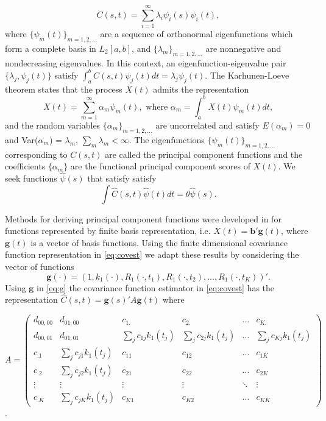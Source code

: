 \begin{equation*}
	C(s,t) = \sum_{i=1}^{\infty}\lambda_i\psi_i(s)\psi_i(t), 
\end{equation*}
where $\{\psi_m(t)\}_{m=1,2,\ldots}$ are a sequence of orthonormal eigenfunctions which form a complete basis in $L_2[a,b]$, and $\{\lambda_m \}_{m=1,2,\ldots}$ are nonnegative and nondecreasing eigenvalues. In this context, an eigenfunction-eigenvalue pair $\{\lambda_j, \psi_j(t)\}$ satisfy $\int_a^bC(s,t)\psi_j(t)dt = \lambda_j\psi_j(t)$. The Karhunen-Loeve theorem states that the process $X(t)$ admits the representation 
\begin{equation*}
	X(t) = \sum_{m=1}^{\infty}\alpha_m \psi_m(t), \mbox{ where } \alpha_m = \int_a^b X(t) \psi_m(t)dt, 
\end{equation*}
and the random variables $\{\alpha_m \}_{m=1,2,\ldots}$ are uncorrelated and satisfy $E(\alpha_m)=0$ and Var($\alpha_m$) = $\lambda_m$, $\sum_m \lambda_m < \infty$. The eigenfunctions $\{\psi_m(t)\}_{m=1,2,\ldots}$ corresponding to $C(s,t)$ are called the principal component functions and the coefficients $\{\alpha_m \}$ are the functional principal component scores of $X(t)$. We seek functions $\hat{\psi}(s)$ that satisfy satisfy 
\begin{equation}
	\label{eq:eigenfuns} \int \hat{C}(s,t)\hat{\psi}(t)dt=\theta\hat{\psi}(s). \nonumber
\end{equation}

Methods for deriving principal component functions were developed in \cite{FDA} for functions represented by finite basis representation, i.e. $X(t) = \mathbf{b}'\mathbf{g}(t)$, where $\mathbf{g}(t)$ is a vector of basis functions. Using the finite dimensional covariance function representation in \eqref{eq:covest} we adapt these results by considering the vector of functions 
\begin{equation}
	\mathbf{g(\cdot)}=(1, k_1(\cdot),R_{1}(\cdot, t_1),R_{1}(\cdot, t_2),\dots, R_{1}(\cdot, t_K))'. \label{eq:g} 
\end{equation}
Using $\mathbf{g}$ in \eqref{eq:g} the covariance function estimator in \eqref{eq:covest} has the representation $\hat{C}(s,t)= \mathbf{g}(s)'A\mathbf{g}(t)$ where \vspace{0.8cm} 
\begin{center}
	$A = \left( 
	\begin{array}{cc|cccc}
		d_{00,00} & d_{01,00} & c_{1.} & c_{2.} & \dots & c_{K.}\\
		d_{00,01} & d_{01,01} & \sum_j c_{1j}k_1(t_j) & \sum_j c_{2j}k_1(t_j) & \dots & \sum_j c_{Kj}k_1(t_j)\\
		\hline c_{.1} & \sum_j c_{j1}k_1(t_j) & c_{11} & c_{12} & \dots & c_{1K}\\
		c_{.2} & \sum_j c_{j2}k_1(t_j) & c_{21} & c_{22} & \dots & c_{2K}\\
		\vdots & \vdots & \vdots & \vdots & \ddots & \vdots \\
		c_{.K} & \sum_j c_{jK}k_1(t_j) & c_{K1} & c_{K2} & \dots & c_{KK} 
	\end{array}
	\right)$. 
\end{center}
\vspace{0.8cm} 

